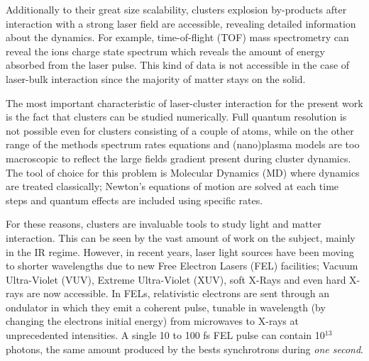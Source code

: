 Additionally to their great size scalability, clusters explosion by-products
after interaction with a strong laser field are accessible, revealing detailed
information about the dynamics. For example, time-of-flight (TOF) mass
spectrometry can reveal the ions charge state spectrum which reveals the amount
of energy absorbed from the laser pulse. This kind of data is not accessible
in the case of laser-bulk interaction since the majority of matter stays on the
solid.

The most important characteristic of laser-cluster interaction for the present
work is the fact that clusters can be studied numerically. Full quantum resolution
is not possible even for clusters consisting of a couple of atoms, while on the
other range of the methods spectrum rates equations and (nano)plasma models are
too macroscopic to reflect the large fields gradient present during cluster
dynamics\cite{Fennel2010}. The tool of choice for this problem is Molecular Dynamics
(MD) where dynamics are treated classically; Newton's equations of motion are
solved at each time steps and quantum effects are included using specific rates.

For these reasons, clusters are invaluable tools to study light and matter
interaction. This can be seen by the vast amount of work on the subject, mainly
in the IR regime\cite{Fennel2010}. However, in recent years, laser light sources
have been moving to shorter wavelengths due to new Free Electron Lasers (FEL)
facilities; Vacuum Ultra-Violet (VUV), Extreme Ultra-Violet (XUV), soft X-Rays
and even hard X-rays are now accessible. In FELs, relativistic electrons are sent
through an ondulator in which they emit a coherent pulse, tunable in wavelength
(by changing the electrons initial energy)
from microwaves to X-rays\cite{Brabec2009,Ackermann2007a,Pellegrini2012} at unprecedented
intensities. A single 10 to 100 fs FEL pulse can contain 10$^{13}$ photons, the
same amount produced by the bests synchrotrons during \textit{one second}\cite{Bostedt2009}.

